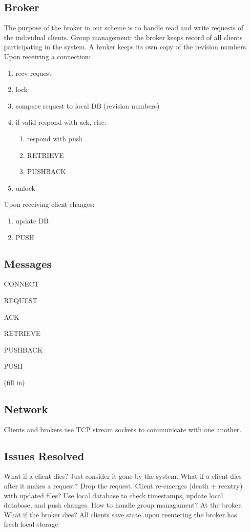 \subsection{Broker}
The purpose of the broker in our scheme is to handle read and write requests of the individual clients. 
Group management: the broker keeps record of all clients participating in the system.
A broker keeps its own copy of the revision numbers.
\newline\newline
Upon receiving a connection:
\begin{enumerate}
\item recv request
\item lock
\item compare request to local DB (revision numbers)
\item if valid respond with ack, else:
  \begin{enumerate}
    \item respond with push
    \item RETRIEVE
    \item PUSHBACK
\end{enumerate}
\item unlock
\end{enumerate}
Upon receiving client changes:
\begin{enumerate}
\item update DB
\item PUSH
\end{enumerate}

\subsection{Messages}
CONNECT

REQUEST

ACK

RETRIEVE

PUSHBACK

PUSH

(fill in)
\subsection{Network}
Clients and brokers use TCP stream sockets to communicate with one another.

\subsection{Issues Resolved}
What if a client dies? Just consider it gone by the system.\newline\newline
What if a client dies after it makes a request? Drop the request.\newline\newline
Client re-emerges (death + reentry) with updated files? Use local database to check timestamps, update local database, and push changes.\newline\newline
How to handle group managament? At the broker.\newline\newline
What if the broker dies? All clients save state..upon reentering the broker has fresh local storage

